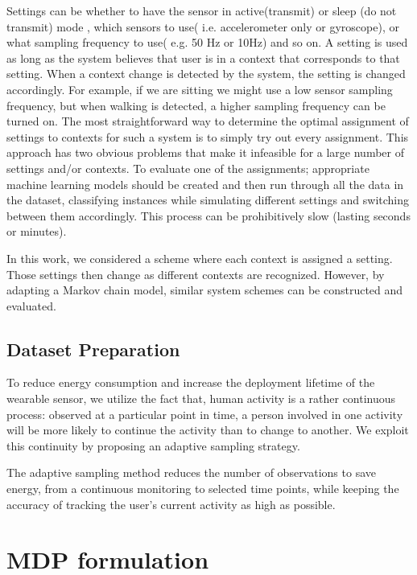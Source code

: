 \documentclass[letterpaper, 10pt, conference]{IEEEtran} %
\begin{document}
 Settings can be  whether to have the sensor in active(transmit) or sleep (do not transmit) mode , which sensors to use( i.e. accelerometer only or gyroscope), or what sampling
frequency to use( e.g. 50 Hz or 10Hz) and so on.
A setting is used as long as the system believes that user is in a context that corresponds to that setting. When a context
change is detected by the system, the setting is changed
accordingly. For example, if we are sitting we might use a
low sensor sampling frequency, but when walking is detected,
a higher sampling frequency can be turned on.
The most straightforward way to determine the optimal assignment of settings to contexts for such a system is to
simply try out every assignment. This approach has two
obvious problems that make it infeasible for a large number
of settings and/or contexts. 
To evaluate one of the assignments; appropriate
machine learning models should be created  and then run through all the
data in the dataset, classifying instances while simulating
different settings and switching between them accordingly. This process can be prohibitively slow (lasting seconds or
minutes).

In this work, we considered a scheme where each context is assigned a setting. Those settings then change as different contexts are recognized. However, by adapting a Markov chain model, similar system schemes can be constructed and evaluated. 



    
    \subsection{Dataset Preparation}
To reduce energy consumption and increase the
deployment lifetime of the wearable sensor, we utilize the fact that, human activity is a rather continuous process: observed at a particular point in time, a person involved in one activity will be more likely to continue the activity than to change to another. We exploit this continuity by proposing an adaptive sampling strategy.

The adaptive sampling method reduces
the number of observations to save energy, from a continuous monitoring to selected time points, while keeping the accuracy of tracking the user’s current activity as high as possible.


 \section{MDP formulation } 
 
\end{document}
